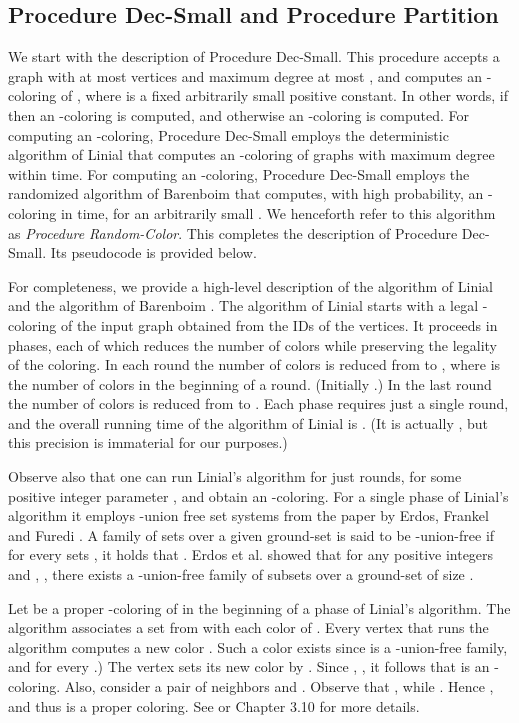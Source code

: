 \documentclass[11pt]{article}
\begin{document}
\subsection{Procedure Dec-Small and Procedure Partition} \label{sc:pr}
We start with the description of Procedure Dec-Small. This procedure accepts a graph  with at most  vertices and maximum degree at most , and computes an -coloring of , where  is a fixed arbitrarily small positive constant. In other words, if  then an -coloring is computed, and otherwise an -coloring is computed. For computing an -coloring, Procedure Dec-Small employs the deterministic algorithm of Linial \cite{L92} that computes an -coloring of graphs with maximum degree  within  time. For computing an -coloring, Procedure Dec-Small employs the randomized algorithm of Barenboim \cite{B12} that computes, with high probability, an -coloring in  time, for an arbitrarily small .  We henceforth refer to this algorithm as {\em Procedure Random-Color}. This completes the description of Procedure Dec-Small. Its pseudocode is provided below. 

For completeness, we provide a high-level description of the algorithm of Linial \cite{L92} and the algorithm of Barenboim \cite{B12}. The algorithm of Linial \cite{L92} starts with a legal -coloring of the input graph obtained from the IDs of the vertices. It proceeds in phases, each of which reduces the number of colors while preserving the legality of the coloring. In each round the number of colors is reduced from  to , where  is the number of colors in the beginning of a round. (Initially .) In the last round the number of colors is reduced from  to . Each phase requires just a single round, and the overall running time of the algorithm of Linial is .
(It is actually , but this precision is immaterial for our purposes.)

Observe also that one can run Linial's algorithm for just  rounds, for some positive integer parameter , and obtain an -coloring.
For a single phase of Linial's algorithm it employs -union free set systems from the paper by Erdos, Frankel and Furedi \cite{EFF85}. A family  of sets over a given ground-set  is said to be -union-free if for every  sets , it holds that . Erdos et al. showed that for any positive integers  and , , there exists a -union-free family  of  subsets over a ground-set  of size .

Let  be a proper -coloring of  in the beginning of a phase of Linial's algorithm. The algorithm associates a set  from  with each color  of . Every vertex  that runs the algorithm computes a new color . Such a color exists since  is a -union-free family, and  for every .) The vertex  sets its new color  by . Since , , it follows that  is an -coloring. Also, consider a pair of neighbors  and . Observe that , while . Hence , and thus  is a proper coloring.
See \cite{L92} or \cite{BE13} Chapter 3.10 for more details.
\end{document}
